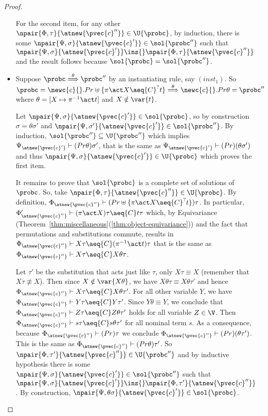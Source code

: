 \begin{proof}
\begin{itemize}
                For the second item, for any other $\npair{\Phi,\tau}{\atnew{\pvec{c}''}} \in \U{\probc}$, by induction, there is some $\npair{\Psi,\sigma}{\atnew{\pvec{c}'}} \in \sol{\probc''}$ such that $\npair{\Psi,\sigma}{\atnew{\pvec{c}'}} \ins{}\npair{\Phi,\tau}{\atnew{\pvec{c}''}}$ and the result follows because $\sol{\probc} = \sol{\probc''}$.
                

                \item Suppose $\probc \overset{\theta}{\Longrightarrow} \probc''$  by an instantiating rule, say $(inst_1)$. So $\probc = \newc{c}{}.Pr\uplus\{\pi\act X \aeq{C}^? t\} \overset{\theta}{\Longrightarrow} \newc{c}{}.Pr\theta = \probc''$ where $\theta = [X\mapsto \pi^{-1}\act t]$ and $X\notin \var{t}$. 
                
                Let $\npair{\Psi,\sigma}{\atnew{\pvec{c}'}} \in \sol{\probc}$, so by construction $\sigma = \theta\sigma'$ and $\npair{\Psi,\sigma'}{\atnew{\pvec{c}'}}\in \sol{\probc''}$. By induction, $\sol{\probc''} \subseteq \U{\probc''}$ which implies $\Psi_{\atnew{\pvec{c}'}} \vdash (Pr\theta)\sigma'$, that is the same as  $\Psi_{\atnew{\pvec{c}'}} \vdash (Pr)(\theta\sigma')$ and thus $\npair{\Psi,\sigma}{\atnew{\pvec{c}'}} \in \U{\probc}$ which proves the first item.

                It remains to prove that $\sol{\probc}$ is a complete set of solutions of $\probc$. So, take $\npair{\Phi,\tau}{\atnew{\pvec{c}''}} \in \U{\probc}$. By definition, $\Phi_{\atnew{\pvec{c}''}} \vdash (Pr\uplus\{\pi\act X\aeq{C}^? t\})\tau$. In particular, $\Phi'_{\atnew{\pvec{c}''}} \vdash (\pi\act X)\tau \aeq{C} t\tau$ which, by Equivariance (Theorem~\ref{thm:miscellaneous}(\ref{thm:object-equivariance})) and the fact that permutations and substitutions commute, results in $\Phi_{\atnew{\pvec{c}''}} \vdash X\tau \aeq{C} (\pi^{-1}\act t)\tau$ that is the same as $\Phi_{\atnew{\pvec{c}''}} \vdash X\tau \aeq{C} X\theta\tau$.
        
                Let $\tau'$ be the substitution that acts just like $\tau$, only $X\tau \equiv X$ (remember that $X\tau \not\equiv X$). Then since $X\notin \var{X\theta}$, we have $X\theta\tau \equiv X\theta\tau'$ and hence $\Phi_{\atnew{\pvec{c}''}} \vdash X\tau \aeq{C} X\theta\tau'$. For all other variable $Y$, we have $\Phi_{\atnew{\pvec{c}''}} \vdash Y\tau \aeq{C} Y\tau'$. Since $Y\theta \equiv Y$, we conclude that  $\Phi_{\atnew{\pvec{c}''}} \vdash Z\tau \aeq{C} Z\theta\tau'$ holds for all variable $Z\in \V$. Then $\Phi_{\atnew{\pvec{c}''}} \vdash s\tau \aeq{C} s\theta\tau'$ for all nominal term $s$. As a consequence, because $\Phi_{\atnew{\pvec{c}''}} \vdash (Pr)\tau$ we conclude $\Phi_{\atnew{\pvec{c}''}} \vdash (Pr)(\theta\tau')$. This is the same as $\Phi_{\atnew{\pvec{c}''}} \vdash (Pr\theta)\tau'$. So $\npair{\Phi,\tau'}{\atnew{\pvec{c}''}}\in \U{\probc''}$ and by inductive hypothesis there is some $\npair{\Psi,\sigma}{\atnew{\pvec{c}'}}\in\sol{\probc''}$ such that  $\npair{\Psi,\sigma}{\atnew{\pvec{c}'}}\ins{} \npair{\Phi,\tau'}{\atnew{\pvec{c}''}}$. By construction, $\npair{\Psi,\theta\sigma}{\atnew{\pvec{c}'}}\in\sol{\probc}$.


\end{itemize}
\end{proof}
